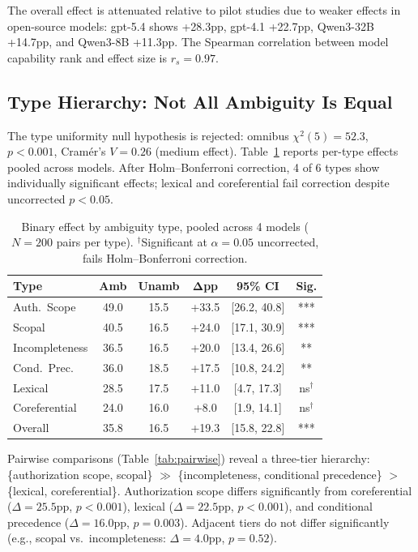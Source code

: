 \documentclass[11pt,a4paper]{article}
\begin{document}
The overall effect is attenuated relative to pilot studies due to weaker effects in open-source models: gpt-5.4 shows +28.3pp, gpt-4.1 +22.7pp, Qwen3-32B +14.7pp, and Qwen3-8B +11.3pp. The Spearman correlation between model capability rank and effect size is $r_s = 0.97$.

\subsection{Type Hierarchy: Not All Ambiguity Is Equal}
\label{sec:type}

The type uniformity null hypothesis is rejected: omnibus $\chi^2(5) = 52.3$, $p < 0.001$, Cram\'{e}r's $V = 0.26$ (medium effect). Table~\ref{tab:binary_effect} reports per-type effects pooled across models. After Holm--Bonferroni correction, 4 of 6 types show individually significant effects; lexical and coreferential fail correction despite uncorrected $p < 0.05$.

\begin{table}[t]
\centering
\small
\begin{tabular}{@{}lccccc@{}}
\toprule
\textbf{Type} & \textbf{Amb} & \textbf{Unamb} & $\boldsymbol{\Delta}$\textbf{pp} & \textbf{95\% CI} & \textbf{Sig.} \\
\midrule
Auth.\ Scope & 49.0 & 15.5 & +33.5 & [26.2, 40.8] & *** \\
Scopal & 40.5 & 16.5 & +24.0 & [17.1, 30.9] & *** \\
Incompleteness & 36.5 & 16.5 & +20.0 & [13.4, 26.6] & ** \\
Cond.\ Prec. & 36.0 & 18.5 & +17.5 & [10.8, 24.2] & ** \\
Lexical & 28.5 & 17.5 & +11.0 & [4.7, 17.3] & ns$^\dagger$ \\
Coreferential & 24.0 & 16.0 & +8.0 & [1.9, 14.1] & ns$^\dagger$ \\
\midrule
Overall & 35.8 & 16.5 & +19.3 & [15.8, 22.8] & *** \\
\bottomrule
\end{tabular}
\caption{Binary effect by ambiguity type, pooled across 4 models ($N = 200$ pairs per type). $^\dagger$Significant at $\alpha = 0.05$ uncorrected, fails Holm--Bonferroni correction.}
\label{tab:binary_effect}
\end{table}

Pairwise comparisons (Table~\ref{tab:pairwise}) reveal a three-tier hierarchy: \{authorization scope, scopal\} $\gg$ \{incompleteness, conditional precedence\} $>$ \{lexical, coreferential\}. Authorization scope differs significantly from coreferential ($\Delta = 25.5$pp, $p < 0.001$), lexical ($\Delta = 22.5$pp, $p < 0.001$), and conditional precedence ($\Delta = 16.0$pp, $p = 0.003$). Adjacent tiers do not differ significantly (e.g., scopal vs.\ incompleteness: $\Delta = 4.0$pp, $p = 0.52$).
\end{document}
